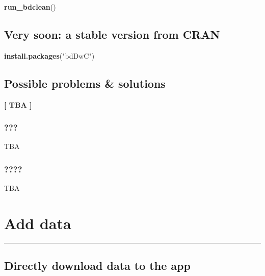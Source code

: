 \documentclass[]{book}
\newenvironment{Shaded}{\begin{snugshade}}{\end{snugshade}}
\newcommand{\KeywordTok}[1]{\textcolor[rgb]{0.13,0.29,0.53}{\textbf{#1}}}
\newcommand{\StringTok}[1]{\textcolor[rgb]{0.31,0.60,0.02}{#1}}
\newcommand{\NormalTok}[1]{#1}
\begin{document}
\begin{Shaded}
\begin{Highlighting}[]
\KeywordTok{run_bdclean}\NormalTok{()}
\end{Highlighting}
\end{Shaded}

\section{\texorpdfstring{{Very soon: a stable version from
CRAN}}{Very soon: a stable version from CRAN}}\label{very-soon-a-stable-version-from-cran}

\begin{Shaded}
\begin{Highlighting}[]
\KeywordTok{install.packages}\NormalTok{(}\StringTok{"bdDwC"}\NormalTok{)}
\end{Highlighting}
\end{Shaded}

\section{Possible problems \&
solutions}\label{possible-problems-solutions}

\textbf{{{[} TBA {]}}}

\subsection{???}\label{section}

TBA

\subsection{????}\label{section-1}

TBA

\chapter{Add data}\label{add-data}

\begin{center}\rule{0.5\linewidth}{\linethickness}\end{center}

\section{Directly download data to the
app}\label{directly-download-data-to-the-app}
\end{document}
